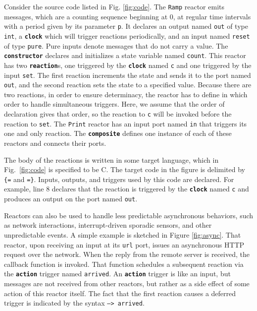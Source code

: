 \documentclass[sigconf]{acmart}
\newcommand{\marten}[1]{\mynote{Marten}{#1}{cyan}}%
\newcommand{\keyword}[1]{\texttt{\textbf{#1}}}
\begin{document}
Consider the source code listed in Fig. \ref{fig:code}. 
The \texttt{Ramp} reactor emits messages, which are a counting sequence beginning at 0, at regular time intervals
with a period given by its parameter \texttt{p}.
\marten{Review:} It declares an output named \texttt{out} of type \texttt{int}, a
\keyword{clock} which will trigger reactions periodically, and an input named {\tt reset} of type {\tt pure}. Pure inputs denote messages that do not carry a value. 
The \keyword{constructor} declares and initializes a state variable named \texttt{count}.
This reactor has two \keyword{reaction}s, one triggered by the \keyword{clock} named \texttt{c}
and one triggered by the input \texttt{set}.
The first reaction increments the state and sends it to the port named \texttt{out}, and the second reaction
sets the state to a specified value.
Because there are two reactions, in order to ensure determinacy, the reactor has to define in which order to
handle simultaneous triggers.
Here, we assume that the order of declaration gives that order, so the reaction to \texttt{c} will be invoked
before the reaction to \texttt{set}.
The \texttt{Print} reactor has an input port named \texttt{in} that triggers its one and only reaction.
The \keyword{composite} defines one instance of each of these reactors and connects their ports.

The body of the reactions is written in some target language, which in Fig.~\ref{fig:code} is specified to be C.
The target code in the figure is delimited by {\tt \{=} and {\tt =\}}.
Inputs, outputs, and triggers used by this code are declared.
For example, line 8 declares that the reaction is triggered by the \keyword{clock} named \texttt{c} and
produces an output on the port named \texttt{out}.

Reactors can also be used to handle less predictable asynchronous behaviors,
such as network interactions, interrupt-driven sporadic sensors, and other unpredictable events.
A simple example is sketched in Figure \ref{fig:async}.
That reactor, upon receiving an input at its \texttt{url} port,
issues an asynchronous HTTP request over the network.
When the reply from the remote server is received, the callback function is invoked.
That function schedules a subsequent reaction via the \keyword{action} trigger named \texttt{arrived}.
An \keyword{action} trigger is like an input, but messages are not received from other reactors,
but rather as a side effect of some action of this reactor itself.
The fact that the first reaction causes a deferred trigger is indicated by the syntax \texttt{--> arrived}.
\end{document}
